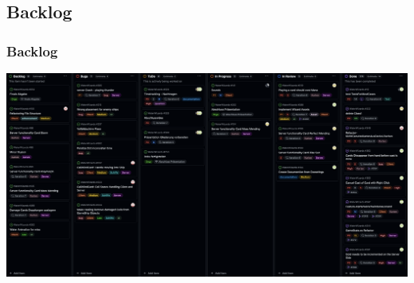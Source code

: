 \documentclass{beamer}
\begin{document}
\subsection{Backlog}
\begin{frame}
\frametitle{Backlog}
  \includegraphics[width=\textwidth]{Kanban.png}
\end{frame}
\end{document}
